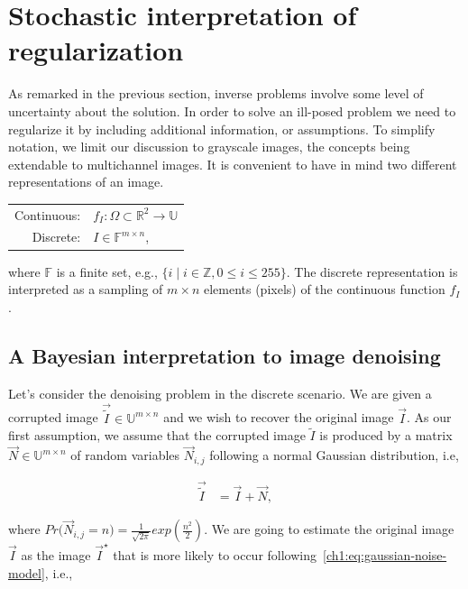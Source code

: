 \section{Stochastic interpretation of regularization}

As remarked in the previous section, inverse problems involve some level of uncertainty about the solution. In order to solve an ill-posed problem we need to regularize it by including additional information, or assumptions. To simplify notation, we limit our discussion to grayscale images, the concepts being extendable to multichannel images. It is convenient to have in mind two different representations of an image. \\

\begin{center}
\begin{tabular}{rl}
	Continuous: & $f_I: \Omega \subset \mathbb{R}^2 \rightarrow \mathbb{U}$ \\
	Discrete: & $I \in \mathbb{F}^{m \times n}$,
\end{tabular}
\end{center}

where $\mathbb{F}$ is a finite set, e.g., $\{ i \; | \; i \in \mathbb{Z}, 0 \leq i \leq 255 \}$. The discrete representation is interpreted as a sampling of $m \times n$ elements (pixels) of the continuous function $f_I$. 

\subsection{A Bayesian interpretation to image denoising}
Let's consider the denoising problem in the discrete scenario. We are given a corrupted image $\vec{\widetilde{I}} \in \mathbb{U}^{m \times n}$ and we wish to recover the original image $\vec{I}$. As our first assumption, we assume that the corrupted image $\widetilde{I}$ is produced by a matrix $\vec{N} \in \mathbb{U}^{m \times n}$ of random variables $\vec{N}_{i,j}$ following a normal Gaussian distribution, i.e, 

\begin{align}
	\vec{\widetilde{I}} &= \vec{I} + \vec{N},
	\label{ch1:eq:gaussian-noise-model}
\end{align} 

where $Pr\big( \vec{N}_{i,j} = n \big) = \frac{1}{\sqrt{2\pi}}exp( \frac{n^2}{2} )$. We are going to estimate the original image $\vec{I}$ as the image $\vec{I}^{\star}$ that is more likely to occur following~\cref{ch1:eq:gaussian-noise-model}, i.e., 

